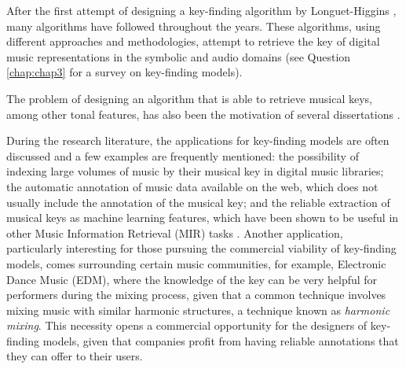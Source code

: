 



After the first attempt of designing a key-finding algorithm by Longuet-Higgins \cite{longuethiggins1971interpreting}, many algorithms have followed throughout the years. These algorithms, using different approaches and methodologies, attempt to retrieve the key of digital music representations in the symbolic and audio domains (see Question \ref{chap:chap3} for a survey on key-finding models). 

The problem of designing an algorithm that is able to retrieve musical keys, among other tonal features, has also been the motivation of several dissertations \cite{gomez2006tonal, campbell2010automatic, korzeniowski2018harmonic, sapp2011computational, chew2000towards}. 

During the research literature, the applications for key-finding models are often discussed and a few examples are frequently mentioned: the possibility of indexing large volumes of music by their musical key in digital music libraries; the automatic annotation of music data available on the web, which does not usually include the annotation of the musical key; and the reliable extraction of musical keys as machine learning features, which have been shown to be useful in other Music Information Retrieval (MIR) tasks \cite{mauch2010approximate, chai2005detection}. Another application, particularly interesting for those pursuing the commercial viability of key-finding models, comes surrounding certain music communities, for example, Electronic Dance Music (EDM), where the knowledge of the key can be very helpful for performers during the mixing process, given that a common technique involves mixing music with similar harmonic structures, a technique known as \emph{harmonic mixing}. This necessity opens a commercial opportunity for the designers of key-finding models, given that companies profit from having reliable annotations that they can offer to their users. 

